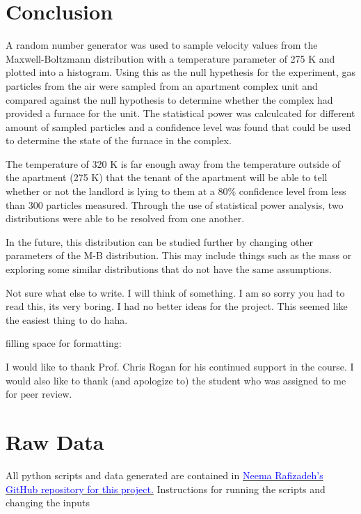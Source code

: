 \documentclass[%
 reprint,
 amsmath,amssymb,
 aps,
]{revtex4-2}
\begin{document}
\section{Conclusion}

A random number generator was used to sample velocity values from the Maxwell-Boltzmann distribution with a temperature parameter of 275 K and plotted into a histogram. Using this as the null hypethesis for the experiment, gas particles from the air were sampled from an apartment complex unit and compared against the null hypothesis to determine whether the complex had provided a furnace for the unit. The statistical power was calculcated for different amount of sampled particles and a confidence level was found that could be used to determine the state of the furnace in the complex.

The temperature of 320 K is far enough away from the temperature outside of the apartment (275 K) that the tenant of the apartment will be able to tell whether or not the landlord is lying to them at a 80\% confidence level from less than 300 particles measured. Through the use of statistical power analysis, two distributions were able to be resolved from one another. 

In the future, this distribution can be studied further by changing other parameters of the M-B distribution. This may include things such as the mass or exploring some similar distributions that do not have the same assumptions. 

Not sure what else to write. I will think of something. I am so sorry you had to read this, its very boring. I had no better ideas for the project. This seemed like the easiest thing to do haha.

filling space for formatting: \lipsum[1]

\acknowledgements

I would like to thank Prof. Chris Rogan for his continued support in the course. I would also like to thank (and apologize to) the student who was assigned to me for peer review.

\appendix
\section{Raw Data}

All python scripts and data generated are contained in \href{https://github.com/rafizadehn/PHSX815_Project1}{\textcolor{blue}{Neema Rafizadeh's GitHub repository for this project.}} Instructions for running the scripts and changing the inputs
\end{document}
